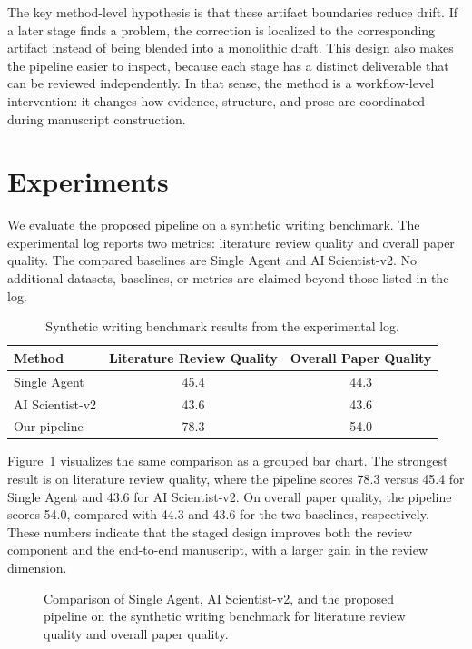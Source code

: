 \documentclass{article}
\begin{document}
The key method-level hypothesis is that these artifact boundaries reduce drift. If a later stage finds a problem, the correction is localized to the corresponding artifact instead of being blended into a monolithic draft. This design also makes the pipeline easier to inspect, because each stage has a distinct deliverable that can be reviewed independently. In that sense, the method is a workflow-level intervention: it changes how evidence, structure, and prose are coordinated during manuscript construction.

\section{Experiments}

We evaluate the proposed pipeline on a synthetic writing benchmark. The experimental log reports two metrics: literature review quality and overall paper quality. The compared baselines are Single Agent and AI Scientist-v2. No additional datasets, baselines, or metrics are claimed beyond those listed in the log.

\begin{table}[t]
  \centering
  \caption{Synthetic writing benchmark results from the experimental log.}
  \label{tab:results}
  \begin{tabular}{lcc}
    \toprule
    Method & Literature Review Quality & Overall Paper Quality \\
    \midrule
    Single Agent & 45.4 & 44.3 \\
    AI Scientist-v2 & 43.6 & 43.6 \\
    Our pipeline & 78.3 & 54.0 \\
    \bottomrule
  \end{tabular}
\end{table}

Figure~\cref{fig:comparison} visualizes the same comparison as a grouped bar chart. The strongest result is on literature review quality, where the pipeline scores 78.3 versus 45.4 for Single Agent and 43.6 for AI Scientist-v2. On overall paper quality, the pipeline scores 54.0, compared with 44.3 and 43.6 for the two baselines, respectively. These numbers indicate that the staged design improves both the review component and the end-to-end manuscript, with a larger gain in the review dimension.

\begin{figure}[t]
  \centering
  
  \caption{Comparison of Single Agent, AI Scientist-v2, and the proposed pipeline on the synthetic writing benchmark for literature review quality and overall paper quality.}
  \label{fig:comparison}
\end{figure}
\end{document}
